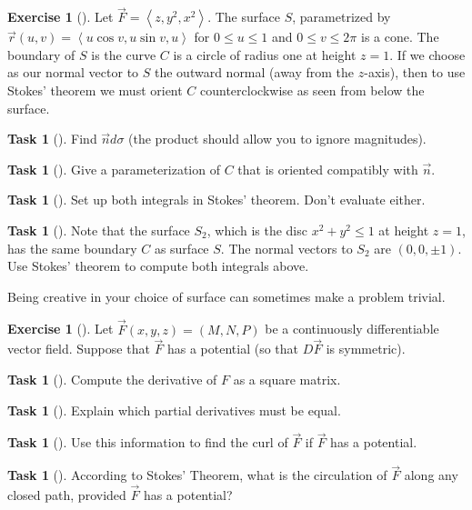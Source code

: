 \documentclass[10pt,]{book}
\theoremstyle{plain}
\theoremstyle{definition}
\theoremstyle{definition}
\theoremstyle{definition}
\theoremstyle{definition}
\newtheorem{exploration}[project]{Exercise}
\newtheorem{task}[project]{Task}
\theoremstyle{definition}
\numberwithin{equation}{section}
\newcommand{\lt}{<}
\begin{document}
\begin{exploration}[]\label{exploration-294}
Let \(\vec F = \left\lt z,y^2,x^2\right>\). The surface \(S\), parametrized by \(\vec r(u,v) = \left\lt u\cos v,u\sin v, u\right>\) for \(0\leq u\leq 1\) and \(0\leq v\leq 2\pi\) is a cone. The boundary of \(S\) is the curve \(C\) is a circle of radius one at height \(z=1\). If we choose as our normal vector to \(S\) the outward normal (away from the \(z\)-axis), then to use Stokes' theorem we must orient \(C\) counterclockwise as seen from below the surface.%
\begin{task}[]\label{task-799}
Find \(\vec n d\sigma\) (the product should allow you to ignore magnitudes).%
\end{task}
\begin{task}[]\label{task-800}
Give a parameterization of \(C\) that is oriented compatibly with \(\vec n\).%
\end{task}
\begin{task}[]\label{task-801}
Set up both integrals in Stokes' theorem. Don't evaluate either.%
\end{task}
\begin{task}[]\label{task-802}
Note that the surface \(S_2\), which is the disc \(x^2+y^2\leq 1\) at height \(z=1\), has the same boundary \(C\) as surface \(S\). The normal vectors to \(S_2\) are \((0,0,\pm 1)\). Use Stokes' theorem to compute both integrals above.%
\end{task}
Being creative in your choice of surface can sometimes make a problem trivial.%
\end{exploration}
\begin{exploration}[]\label{exploration-295}
Let \(\vec F(x,y,z)=(M,N,P)\) be a continuously differentiable vector field. Suppose that \(\vec F\) has a potential (so that \(D\vec F\) is symmetric).%
\begin{task}[]\label{task-803}
Compute the derivative of \(F\) as a square matrix.%
\end{task}
\begin{task}[]\label{task-804}
Explain which partial derivatives must be equal.%
\end{task}
\begin{task}[]\label{task-805}
Use this information to find the curl of \(\vec F\) if \(\vec F\) has a potential.%
\end{task}
\begin{task}[]\label{task-806}
According to Stokes' Theorem, what is the circulation of \(\vec F\) along any closed path, provided \(\vec F\) has a potential?%
\end{task}
\end{exploration}
\end{document}
